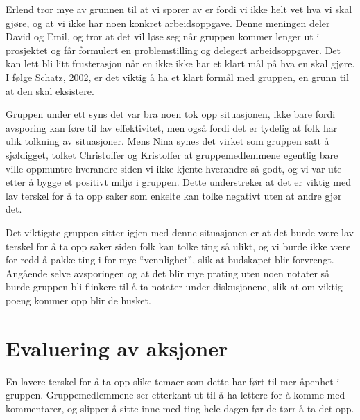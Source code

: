 Erlend tror mye av grunnen til at vi sporer av er fordi vi ikke helt vet hva vi skal gjøre, og at vi ikke har noen konkret 
arbeidsoppgave. Denne meningen deler David og Emil, og tror at det vil løse seg når gruppen kommer lenger ut i prosjektet og får 
formulert en problemstilling og delegert arbeidsoppgaver. Det kan lett bli litt frusterasjon når en ikke ikke har et klart mål på hva en 
skal gjøre. I følge Schatz, 2002, er det viktig å ha et klart formål med gruppen, en grunn til at den skal eksistere.

Gruppen under ett syns det var bra noen tok opp situasjonen, ikke bare fordi avsporing kan føre til lav effektivitet, men også fordi det 
er tydelig at folk har ulik tolkning av situasjoner. Mens Nina synes det virket som gruppen satt å sjøldigget, tolket Christoffer og 
Kristoffer at gruppemedlemmene egentlig bare ville oppmuntre hverandre siden vi ikke kjente hverandre så godt, og vi var ute etter å 
bygge et positivt miljø i gruppen. Dette understreker at det er viktig med lav terskel for å ta opp saker som enkelte kan tolke negativt 
uten at andre gjør det.

Det viktigste gruppen sitter igjen med denne situasjonen er at det burde være lav terskel for å ta opp saker siden folk kan tolke ting så 
ulikt, og vi burde ikke være for redd å pakke ting i for mye ``vennlighet'', slik at budskapet blir forvrengt. Angående selve avsporingen 
og at det blir mye prating uten noen notater så burde gruppen bli flinkere til å ta notater under diskusjonene, slik at om viktig poeng 
kommer opp blir de husket.

\section{Evaluering av aksjoner}
En lavere terskel for å ta opp slike temaer som dette har ført til mer åpenhet i gruppen. Gruppemedlemmene ser etterkant ut til å ha lettere for å komme med kommentarer, og slipper å sitte inne med ting hele dagen før de tørr å ta det opp.


